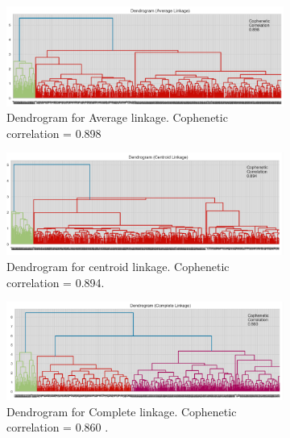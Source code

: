 \documentclass[10pt,a4paper]{style}
\begin{document}
		\begin{figure}[h]
			\centering
			\begin{subfigure}[t]{0.49\textwidth}
				\includegraphics[width=\textwidth]{Euc_dendo_Average_linkage.png}
				\caption{Dendrogram for Average linkage. Cophenetic correlation = 0.898}
				\label{fig:Euc_dendo_Average_linkage.png}
			\end{subfigure}
			\hfill
			\begin{subfigure}[t]{0.49\textwidth}
				\includegraphics[width=\textwidth]{Euc_dendo_centroid_linkage.png}
				\caption{Dendrogram for centroid linkage. Cophenetic correlation = 0.894.}
				\label{fig:Euc_dendo_centroid_linkage.png}
			\end{subfigure}
			\begin{subfigure}[t]{0.49\textwidth}
				\includegraphics[width=\textwidth]{Euc_dendo_complete_linkage.png}
				\caption{Dendrogram for Complete linkage. Cophenetic correlation = 0.860 .}
				\label{fig:Euc_dendo_complete_linkage.pngg}
			\end{subfigure}
			\hfill
			\begin{subfigure}[t]{0.49\textwidth}

\end{subfigure}
\end{figure}
\end{document}
